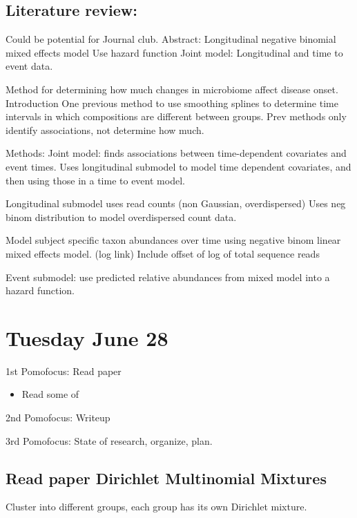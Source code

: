 \documentclass[10pt]{article}
\theoremstyle{definition}
\begin{document}
\subsection{Literature review: \cite{luna2020}}
Could be potential for Journal club.
Abstract:
Longitudinal negative binomial mixed effects model
Use hazard function
Joint model: Longitudinal and time to event data.

Method for determining how much changes in microbiome affect disease onset.
Introduction
One previous method to use smoothing splines to determine time intervals in which compositions are different between groups.
Prev methods only identify associations, not determine how much.

Methods:
Joint model: finds associations between time-dependent covariates and event times. Uses longitudinal submodel to model time dependent covariates, and then using those in a time to event model.

Longitudinal submodel uses read counts (non Gaussian, overdispersed)
Uses neg binom distribution to model overdispersed count data.

Model subject specific taxon abundances over time using negative binom linear mixed effects model. (log link)
Include offset of log of total sequence reads

Event submodel: use predicted relative abundances from mixed model into a hazard function.


\section{Tuesday June 28}

\begin{todolist}
  \item 1st Pomofocus: Read paper
  \begin{itemize}
    \item Read some of \cite{holmes2012}
  \end{itemize}
  \item 2nd Pomofocus: Writeup
  \item 3rd Pomofocus: State of research, organize, plan.
\end{todolist}

\subsection{Read paper Dirichlet Multinomial Mixtures \cite{holmes2012}}

Cluster into different groups, each group has its own Dirichlet mixture.
\end{document}

